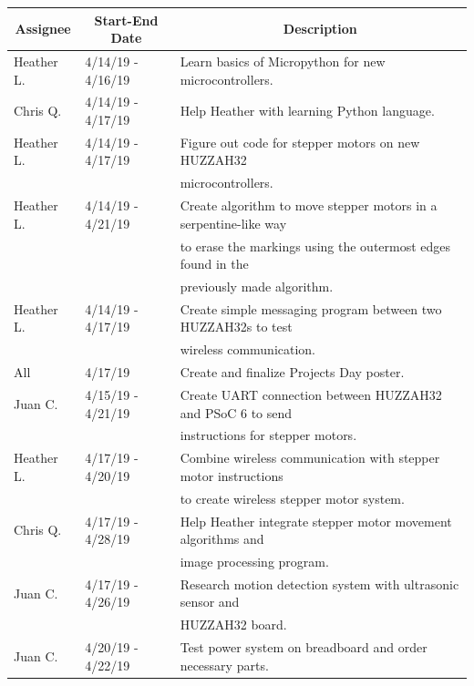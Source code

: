 \begin{table} [H]	
	\normalsize
	\centering
	\begin{tabular}{|l|l|l|}
		\hline
		\multicolumn{1}{|c|}{\textbf{Assignee}} & \multicolumn{1}{|c|}{\textbf{Start-End Date}} & \multicolumn{1}{|c|}{\textbf{Description}} \\
		\hline			
		
		Heather L. & 4/14/19 - 4/16/19 	& Learn basics of Micropython for new microcontrollers. \\
				\hline
		Chris Q. & 4/14/19 - 4/17/19 	& Help Heather with learning Python language. \\
		\hline
		Heather L. & 4/14/19 - 4/17/19 	& Figure out code for stepper motors on new HUZZAH32 \\
					&					& microcontrollers. \\
		\hline
		Heather L. & 4/14/19 - 4/21/19 	& Create algorithm to move stepper motors in a serpentine-like way \\
					&					& to erase the markings using the outermost edges found in the \\
					&					& previously made algorithm. \\
		\hline
		Heather L. & 4/14/19 - 4/17/19 	& Create simple messaging program between two HUZZAH32s to test \\ 			&					& wireless communication. \\
		\hline
		All & 4/17/19 					& Create and finalize Projects Day poster. \\
		\hline
		Juan C.   & 4/15/19 - 4/21/19   & Create UART connection between HUZZAH32 and PSoC 6 to send \\
					&					& instructions for stepper motors. \\
		\hline
		Heather L. & 4/17/19 - 4/20/19 	& Combine wireless communication with stepper motor instructions \\
					&					& to create wireless stepper motor system. \\
		\hline
		Chris Q. & 4/17/19 - 4/28/19 	& Help Heather integrate stepper motor movement algorithms and \\
					&					& image processing program. \\
		\hline
		Juan C. & 4/17/19 - 4/26/19 	& Research motion detection system with ultrasonic sensor and \\
					&					& HUZZAH32 board. \\
		\hline
		Juan C. & 4/20/19 - 4/22/19 	& Test power system on breadboard and order necessary parts. \\

\end{tabular}
\end{table}
